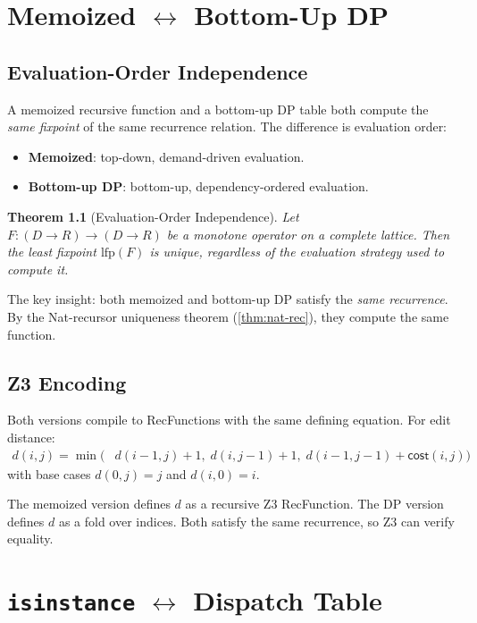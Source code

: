 \documentclass[11pt,a4paper]{report}
\theoremstyle{definition}
\theoremstyle{plain}
\newtheorem{theorem}[definition]{Theorem}
\begin{document}
\chapter{Memoized $\leftrightarrow$ Bottom-Up DP}
\label{ch:memo-dp}

\section{Evaluation-Order Independence}

A memoized recursive function and a bottom-up DP table both compute
the \emph{same fixpoint} of the same recurrence relation.  The
difference is evaluation order:
\begin{itemize}
  \item \textbf{Memoized}: top-down, demand-driven evaluation.
  \item \textbf{Bottom-up DP}: bottom-up, dependency-ordered evaluation.
\end{itemize}

\begin{theorem}[Evaluation-Order Independence]
Let $F : (D \to R) \to (D \to R)$ be a monotone operator on a
complete lattice.  Then the least fixpoint $\mathrm{lfp}(F)$ is
unique, regardless of the evaluation strategy used to compute it.
\end{theorem}

The key insight: both memoized and bottom-up DP satisfy the \emph{same
recurrence}.  By the Nat-recursor uniqueness theorem
(\ref{thm:nat-rec}), they compute the same function.

\section{Z3 Encoding}

Both versions compile to RecFunctions with the same defining equation.
For edit distance:
\begin{align}
  d(i, j) = \min\big(&d(i{-}1, j) + 1,\;
    d(i, j{-}1) + 1,\;
    d(i{-}1, j{-}1) + \mathsf{cost}(i, j)\big)
\end{align}
with base cases $d(0, j) = j$ and $d(i, 0) = i$.

The memoized version defines $d$ as a recursive Z3 RecFunction.
The DP version defines $d$ as a fold over indices.  Both satisfy
the same recurrence, so Z3 can verify equality.


\chapter{\texttt{isinstance} $\leftrightarrow$ Dispatch Table}
\label{ch:isinstance}
\end{document}
